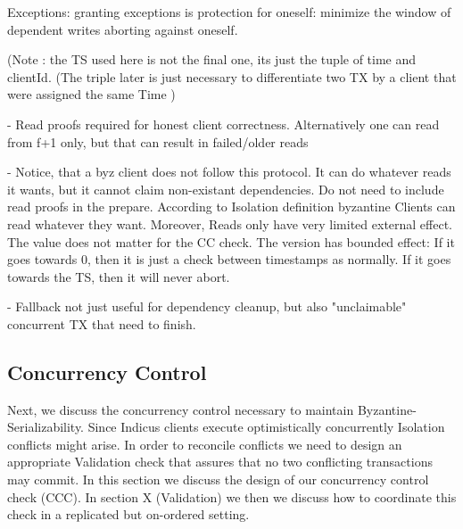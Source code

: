 Exceptions: granting exceptions is protection for oneself: minimize the window of dependent writes aborting against oneself. 

(Note : the TS used here is not the final one, its just the tuple of time and clientId. (The triple later is just necessary to differentiate two TX by a client that were assigned the same Time
)



- Read proofs required for honest client correctness. Alternatively one can read from f+1 only, but that can result in failed/older reads

- Notice, that a byz client does not follow this protocol. It can do whatever reads it wants, but it cannot claim non-existant dependencies. Do not need to include read proofs in the prepare. According to Isolation definition byzantine Clients can read whatever they want. Moreover, Reads only have very limited external effect. The value does not matter for the CC check. The version has bounded effect: If it goes towards 0, then it is just a check between timestamps as normally. If it goes towards the TS, then it will never abort.

- Fallback not just useful for dependency cleanup, but also "unclaimable" concurrent TX that need to finish.




\subsection{Concurrency Control}
Next, we discuss the concurrency control necessary to maintain Byzantine-Serializability. Since Indicus clients execute optimistically concurrently Isolation conflicts might arise. In order to reconcile conflicts we need to design an appropriate Validation check that assures that no two conflicting transactions may commit. In this section we discuss the design of our concurrency control check (CCC). In section X (Validation) we then we discuss how to coordinate this check in a replicated but on-ordered setting.

